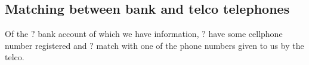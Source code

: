 \subsection{Matching between bank and telco telephones}

Of the \( ? \) bank account of which we have information, \( ? \) have some cellphone number registered and \( ? \) match with one of the phone numbers given to us by the telco.
